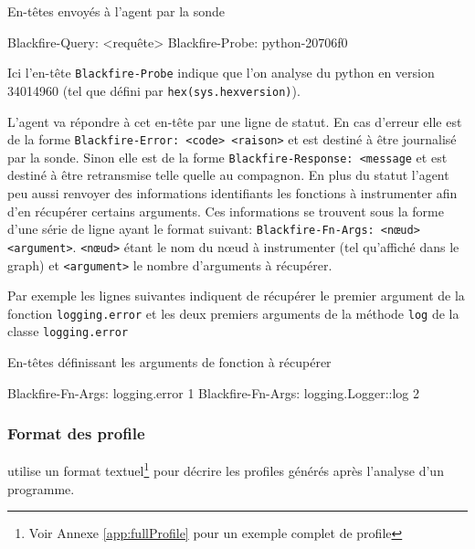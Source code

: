 \begin{listing}[H]
\caption{En-têtes envoyés à l'agent par la sonde}
\begin{textcode}
Blackfire-Query: <requête>
Blackfire-Probe: python-20706f0
\end{textcode}
\end{listing}
Ici l'en-tête  \verb|Blackfire-Probe| indique que l'on analyse du python en version 34014960 (tel que défini par \texttt{hex(sys.hexversion)}).

L'agent va répondre à cet en-tête par une ligne de statut. En cas d'erreur elle est de la forme \verb|Blackfire-Error: <code> <raison>| et est destiné à être journalisé par la sonde. Sinon elle est de la forme \verb|Blackfire-Response: <message|
et est destiné à être retransmise telle quelle au compagnon. En plus du statut l'agent peu aussi renvoyer des informations identifiants les fonctions à instrumenter afin d'en récupérer certains arguments. Ces informations se trouvent sous la forme d'une série de ligne ayant le format suivant: \verb|Blackfire-Fn-Args: <nœud> <argument>|.
\verb|<nœud>| étant le nom du nœud à instrumenter (tel qu'affiché dans le graph) et \verb|<argument>| le nombre d'arguments à récupérer.

Par exemple les lignes suivantes indiquent de récupérer le premier argument de la fonction \verb|logging.error| et les deux premiers arguments de la méthode \verb|log| de la classe \verb|logging.error|
\begin{listing}[H]
\caption{En-têtes définissant les arguments de fonction à récupérer}
\begin{textcode}
Blackfire-Fn-Args: logging.error 1
Blackfire-Fn-Args: logging.Logger::log 2
\end{textcode}
\end{listing}

				\subsubsection{Format des profile}
\Blackfire utilise un format textuel\footnote{Voir Annexe \vref{app:fullProfile} pour un exemple complet de profile} pour décrire les profiles générés après l'analyse d'un programme.

